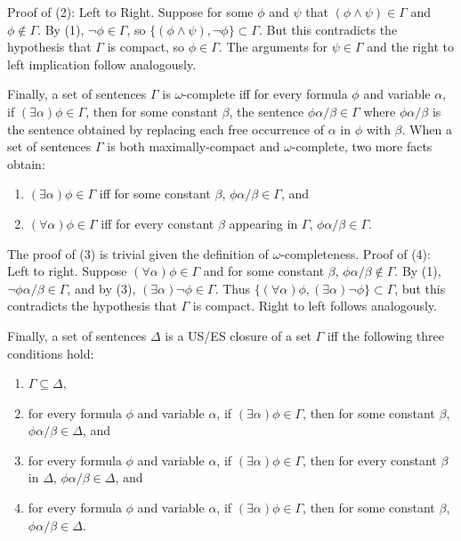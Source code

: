 \documentclass[12pt]{article}
\theoremstyle{definition}
\theoremstyle{remark}
\begin{document}
Proof of (2): Left to Right. Suppose for some $\phi$ and $\psi$ that $(\phi \land \psi) \in \Gamma$ and $\phi \not\in \Gamma$. By (1), $\neg\phi \in \Gamma$, so $\{ (\phi \land \psi), \neg\phi \} \subset \Gamma$. But this contradicts the hypothesis that $\Gamma$ is compact, so $\phi \in \Gamma$. The arguments for $\psi \in \Gamma$ and the right to left implication follow analogously.

Finally, a set of sentences $\Gamma$ is $\omega$-complete iff for every formula $\phi$ and variable $\alpha$, if $(\exists \alpha)\phi \in \Gamma$, then for some constant $\beta$, the sentence $\phi\alpha/\beta \in \Gamma$ where $\phi\alpha/\beta$ is the sentence obtained by replacing each free occurrence of $\alpha$ in $\phi$ with $\beta$. When a set of sentences $\Gamma$ is both maximally-compact and $\omega$-complete, two more facts obtain:

\begin{enumerate}
	\item[(3)] $(\exists \alpha)\phi \in \Gamma$ iff for some constant $\beta$, $\phi\alpha/\beta \in \Gamma$, and
	\item[(4)] $(\forall \alpha)\phi \in \Gamma$ iff for every constant $\beta$ appearing in $\Gamma$, $\phi\alpha/\beta \in \Gamma$.
\end{enumerate}

The proof of (3) is trivial given the definition of $\omega$-completeness. Proof of (4): Left to right. Suppose $(\forall \alpha)\phi \in \Gamma$ and for some constant $\beta$, $\phi\alpha/\beta \not\in \Gamma$. By (1), $\neg\phi\alpha/\beta \in \Gamma$, and by (3), $(\exists \alpha)\neg\phi \in \Gamma$. Thus $\{ (\forall \alpha)\phi, (\exists \alpha)\neg\phi \} \subset \Gamma$, but this contradicts the hypothesis that $\Gamma$ is compact. Right to left follows analogously.

Finally, a set of sentences $\Delta$ is a US/ES closure of a set $\Gamma$ iff the following three conditions hold:

\begin{enumerate}
	\item $\Gamma \subseteq \Delta$,
	\item for every formula $\phi$ and variable $\alpha$, if $(\exists \alpha)\phi \in \Gamma$, then for some constant $\beta$, $\phi\alpha/\beta \in \Delta$, and
	\item for every formula $\phi$ and variable $\alpha$, if $(\exists \alpha)\phi \in \Gamma$, then for every constant $\beta$ in $\Delta$, $\phi\alpha/\beta \in \Delta$, and
	\item for every formula $\phi$ and variable $\alpha$, if $(\exists \alpha)\phi \in \Gamma$, then for some constant $\beta$, $\phi\alpha/\beta \in \Delta$.
\end{enumerate}
\end{document}
